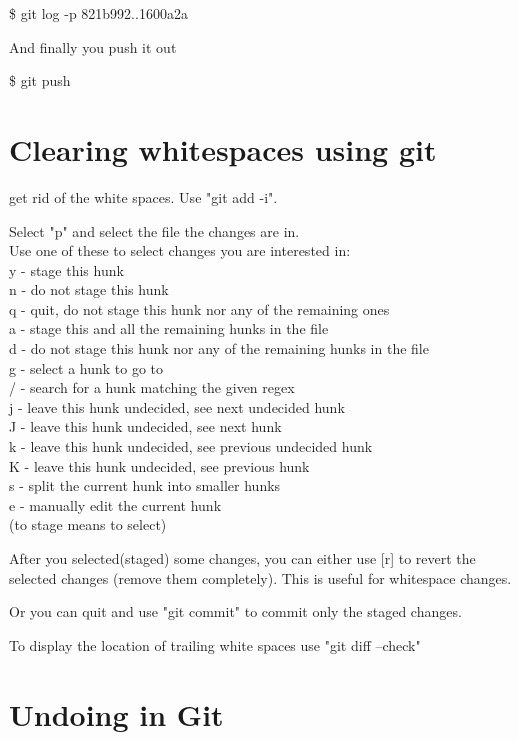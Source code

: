 \documentclass[a4paper,10pt]{article}
\begin{document}
   \$ git log -p 821b992..1600a2a

   And finally you push it out

   \$ git push



\section{Clearing whitespaces using git}

get rid of the white spaces. Use "git add -i".

    Select "p" and select the file the changes are in. \\
    Use one of these to select changes you are interested in:\\
    y - stage this hunk\\
    n - do not stage this hunk\\
    q - quit, do not stage this hunk nor any of the remaining ones\\
    a - stage this and all the remaining hunks in the file\\
    d - do not stage this hunk nor any of the remaining hunks in the file\\
    g - select a hunk to go to\\
    / - search for a hunk matching the given regex\\
    j - leave this hunk undecided, see next undecided hunk\\
    J - leave this hunk undecided, see next hunk\\
    k - leave this hunk undecided, see previous undecided hunk\\
    K - leave this hunk undecided, see previous hunk\\
    s - split the current hunk into smaller hunks\\
    e - manually edit the current hunk\\

    (to stage means to select)

    After you selected(staged) some changes, you can either use [r] to revert the selected changes (remove them completely). This is useful for whitespace changes.

    Or you can quit and use "git commit" to commit only the staged changes.

To display the location of trailing white spaces use "git diff --check"    

\section{Undoing in Git}
\end{document}
